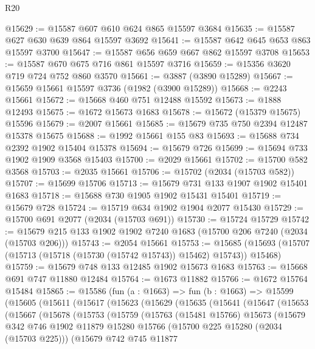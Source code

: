 \begin{lexlean}{R20}
\begin{coremodule}
@15629 := @15587 @607 @610 @624 @865 @15597 @3684
@15635 := @15587 @627 @630 @639 @864 @15597 @3692
@15641 := @15587 @642 @645 @653 @863 @15597 @3700
@15647 := @15587 @656 @659 @667 @862 @15597 @3708
@15653 := @15587 @670 @675 @716 @861 @15597 @3716
@15659 := @15356 @3620 @719 @724 @752 @860 @3570
@15661 := @3887 (@3890 @15289)
@15667 := @15659 @15661 @15597 @3736 (@1982 (@3900 @15289))
@15668 := @2243 @15661
@15672 := @15668 @460 @751 @12488 @15592
@15673 := @1888 @12493
@15675 := @1672 @15673 @1683
@15678 := @15672 (@15379 @15675) @15596
@15679 := @2007 @15661
@15685 := @15679 @735 @750 @2394 @12487 @15378 @15675
@15688 := @1992 @15661 @155 @83
@15693 := @15688 @734 @2392 @1902 @15404 @15378
@15694 := @15679 @726
@15699 := @15694 @733 @1902 @1909 @3568 @15403
@15700 := @2029 @15661
@15702 := @15700 @582 @3568
@15703 := @2035 @15661
@15706 := @15702 (@2034 (@15703 @582))
@15707 := @15699 @15706
@15713 := @15679 @731 @133 @1907 @1902 @15401 @1683
@15718 := @15688 @730 @1905 @1902 @15431 @15401
@15719 := @15679 @728
@15724 := @15719 @634 @1902 @1904 @2077 @15430
@15729 := @15700 @691 @2077 (@2034 (@15703 @691))
@15730 := @15724 @15729
@15742 := @15679 @215 @133 @1902 @1902 @7240 @1683 (@15700 @206 @7240 (@2034 (@15703 @206)))
@15743 := @2054 @15661
@15753 := @15685 (@15693 (@15707 (@15713 (@15718 (@15730 (@15742 @15743)) @15462) @15743)) @15468)
@15759 := @15679 @748 @133 @12485 @1902 @15673 @1683
@15763 := @15668 @691 @747 @11880 @12484
@15764 := @1673 @11882
@15766 := @1672 @15764 @15484
@15865 := @15586
    (fun (a : @1663) =>
    fun (b : @1663) =>
    @15599
      (@15605
        (@15611
          (@15617
            (@15623
              (@15629
                (@15635
                  (@15641
                    (@15647
                      (@15653
                        (@15667
                          (@15678
                            (@15753
                              (@15759
                                (@15763
                                  (@15481 @15766)
                                  @15673
                                  (@15679
                                    @342
                                    @746
                                    @1902
                                    @11879
                                    @15280
                                    @15766
                                    (@15700 @225 @15280 (@2034 (@15703 @225)))
                                    (@15679
                                      @742
                                      @745
                                      @11877

\end{coremodule}
\end{lexlean}
